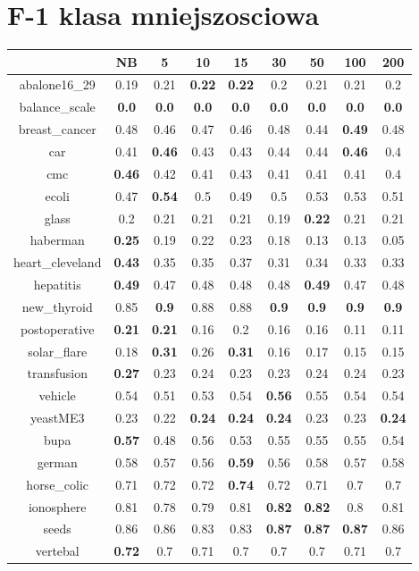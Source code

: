 \documentclass{article}%
\begin{document}
%
\section*{F{-}1 klasa mniejszosciowa}%
\begin{tabular}{c|cccccccc}%
\hline%
&NB&5&10&15&30&50&100&200\\%
\hline%
abalone16\_29&0.19&0.21&\textbf{0.22}&\textbf{0.22}&0.2&0.21&0.21&0.2\\%
\hline%
balance\_scale&\textbf{0.0}&\textbf{0.0}&\textbf{0.0}&\textbf{0.0}&\textbf{0.0}&\textbf{0.0}&\textbf{0.0}&\textbf{0.0}\\%
\hline%
breast\_cancer&0.48&0.46&0.47&0.46&0.48&0.44&\textbf{0.49}&0.48\\%
\hline%
car&0.41&\textbf{0.46}&0.43&0.43&0.44&0.44&\textbf{0.46}&0.4\\%
\hline%
cmc&\textbf{0.46}&0.42&0.41&0.43&0.41&0.41&0.41&0.4\\%
\hline%
ecoli&0.47&\textbf{0.54}&0.5&0.49&0.5&0.53&0.53&0.51\\%
\hline%
glass&0.2&0.21&0.21&0.21&0.19&\textbf{0.22}&0.21&0.21\\%
\hline%
haberman&\textbf{0.25}&0.19&0.22&0.23&0.18&0.13&0.13&0.05\\%
\hline%
heart\_cleveland&\textbf{0.43}&0.35&0.35&0.37&0.31&0.34&0.33&0.33\\%
\hline%
hepatitis&\textbf{0.49}&0.47&0.48&0.48&0.48&\textbf{0.49}&0.47&0.48\\%
\hline%
new\_thyroid&0.85&\textbf{0.9}&0.88&0.88&\textbf{0.9}&\textbf{0.9}&\textbf{0.9}&\textbf{0.9}\\%
\hline%
postoperative&\textbf{0.21}&\textbf{0.21}&0.16&0.2&0.16&0.16&0.11&0.11\\%
\hline%
solar\_flare&0.18&\textbf{0.31}&0.26&\textbf{0.31}&0.16&0.17&0.15&0.15\\%
\hline%
transfusion&\textbf{0.27}&0.23&0.24&0.23&0.23&0.24&0.24&0.23\\%
\hline%
vehicle&0.54&0.51&0.53&0.54&\textbf{0.56}&0.55&0.54&0.54\\%
\hline%
yeastME3&0.23&0.22&\textbf{0.24}&\textbf{0.24}&\textbf{0.24}&0.23&0.23&\textbf{0.24}\\%
\hline%
bupa&\textbf{0.57}&0.48&0.56&0.53&0.55&0.55&0.55&0.54\\%
\hline%
german&0.58&0.57&0.56&\textbf{0.59}&0.56&0.58&0.57&0.58\\%
\hline%
horse\_colic&0.71&0.72&0.72&\textbf{0.74}&0.72&0.71&0.7&0.7\\%
\hline%
ionosphere&0.81&0.78&0.79&0.81&\textbf{0.82}&\textbf{0.82}&0.8&0.81\\%
\hline%
seeds&0.86&0.86&0.83&0.83&\textbf{0.87}&\textbf{0.87}&\textbf{0.87}&0.86\\%
\hline%
vertebal&\textbf{0.72}&0.7&0.71&0.7&0.7&0.7&0.71&0.7\\%
\hline%
\end{tabular}
\end{document}
